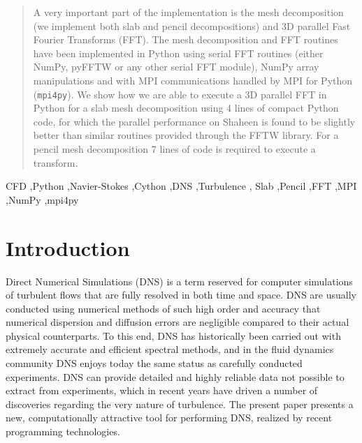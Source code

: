 \documentclass[final,3p,times,twocolumn]{elsarticle}
\newcommand{\inpyth}{\lstinline[style=inlinestyle]} %[]%
\begin{document}
\begin{frontmatter}
\begin{abstract}
A very important part of the implementation is the mesh decomposition (we 
implement both slab and pencil decompositions) and 3D parallel Fast Fourier 
Transforms (FFT). The mesh decomposition and FFT routines have been implemented 
in Python using serial FFT routines (either NumPy, pyFFTW or any other serial 
FFT module), NumPy array manipulations and with MPI communications handled by  
MPI for Python (\inpyth{mpi4py}). We show how we are able to execute a 3D 
parallel FFT in Python for a slab mesh decomposition using 4 lines of compact 
Python code, for which the parallel performance on Shaheen is found to be 
slightly better than similar routines provided through the FFTW library. For a 
pencil mesh decomposition 7 lines of code is required to execute a transform.


\end{abstract}

\begin{keyword}
CFD \sep Python \sep Navier-Stokes \sep Cython \sep DNS \sep Turbulence \sep 
Slab \sep Pencil \sep FFT \sep MPI \sep NumPy \sep mpi4py

\end{keyword}

\end{frontmatter}

\section{Introduction}
Direct Numerical Simulations (DNS) is a term reserved for computer simulations 
of turbulent flows that are fully resolved in both time and space. DNS are 
usually conducted using numerical methods of such high order and accuracy that 
numerical dispersion and diffusion errors are negligible compared to their 
actual physical
counterparts. To this end, DNS has historically been carried out with extremely 
accurate and efficient spectral methods, and in the fluid dynamics community 
DNS enjoys  today the same status as carefully conducted experiments. DNS can 
provide detailed and highly reliable data not possible to extract from
experiments, which in recent years have driven a number of discoveries 
regarding the very nature of turbulence. The present paper presents a new, 
computationally attractive tool for performing DNS, realized by recent 
programming technologies.
\end{document}
